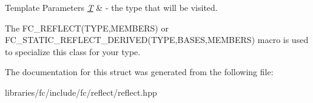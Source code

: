 \begin{DoxyTemplParams}{Template Parameters}
{\em \mbox{\hyperlink{struct_t}{T}}} & -\/ the type that will be visited.\\
\hline
\end{DoxyTemplParams}
The F\+C\+\_\+\+R\+E\+F\+L\+E\+C\+T(\+T\+Y\+P\+E,\+M\+E\+M\+B\+E\+R\+S) or F\+C\+\_\+\+S\+T\+A\+T\+I\+C\+\_\+\+R\+E\+F\+L\+E\+C\+T\+\_\+\+D\+E\+R\+I\+V\+E\+D(\+T\+Y\+P\+E,\+B\+A\+S\+E\+S,\+M\+E\+M\+B\+E\+R\+S) macro is used to specialize this class for your type. 

The documentation for this struct was generated from the following file\+:\begin{DoxyCompactItemize}
\item 
libraries/fc/include/fc/reflect/reflect.\+hpp\end{DoxyCompactItemize}
